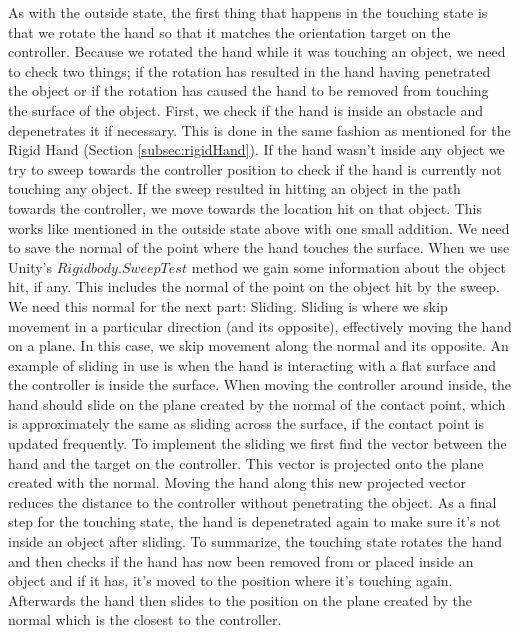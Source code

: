 As with the outside state, the first thing that happens in the touching state is that we rotate the hand so that it matches the orientation target on the controller. Because we rotated the hand while it was touching an object, we need to check two things; if the rotation has resulted in the hand having penetrated the object or if the rotation has caused the hand to be removed from touching the surface of the object. First, we check if the hand is inside an obstacle and depenetrates it if necessary. This is done in the same fashion as mentioned for the Rigid Hand (Section \ref{subsec:rigidHand}). If the hand wasn't inside any object we try to sweep towards the controller position to check if the hand is currently not touching any object. If the sweep resulted in hitting an object in the path towards the controller, we move towards the location hit on that object. This works like mentioned in the outside state above with one small addition. We need to save the normal of the point where the hand touches the surface. When we use Unity's $Rigidbody.SweepTest$ method we gain some information about the object hit, if any. This includes the normal of the point on the object hit by the sweep. We need this normal for the next part: Sliding. Sliding is where we skip movement in a particular direction (and its opposite), effectively moving the hand on a plane. In this case, we skip movement along the normal and its opposite. An example of sliding in use is when the hand is interacting with a flat surface and the controller is inside the surface. When moving the controller around inside, the hand should slide on the plane created by the normal of the contact point, which is approximately the same as sliding across the surface, if the contact point is updated frequently. To implement the sliding we first find the vector between the hand and the target on the controller. This vector is projected onto the plane created with the normal. Moving the hand along this new projected vector reduces the distance to the controller without penetrating the object. As a final step for the touching state, the hand is depenetrated again to make sure it's not inside an object after sliding. To summarize, the touching state rotates the hand and then checks if the hand has now been removed from or placed inside an object and if it has, it's moved to the position where it's touching again. Afterwards the hand then slides to the position on the plane created by the normal which is the closest to the controller.

